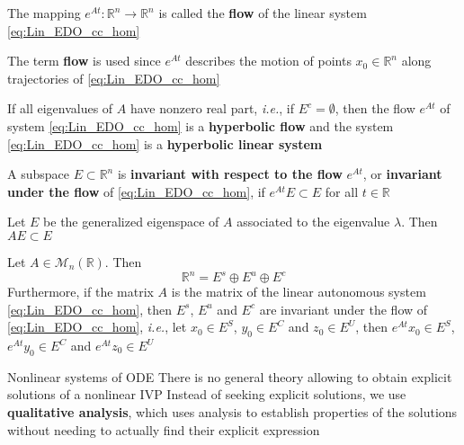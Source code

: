 \documentclass{beamer}
\def\ie{\emph{i.e.}}
\def\defword#1{\textbf{#1}}
\begin{document}
\begin{frame}
\begin{definition}
The mapping $e^{At}:\mathbb{R}^n\to\mathbb{R}^n$ is called the \defword{flow} of the linear system \eqref{eq:Lin_EDO_cc_hom}
\end{definition}
The term \defword{flow} is used since $e^{At}$ describes the motion of points $x_0\in\mathbb{R}^n$ along trajectories of \eqref{eq:Lin_EDO_cc_hom}
\begin{definition}
If all eigenvalues of $A$ have nonzero real part, \ie, if $E^c=\emptyset$, then the flow $e^{At}$ of system \eqref{eq:Lin_EDO_cc_hom} is a \defword{hyperbolic flow} and the system \eqref{eq:Lin_EDO_cc_hom} is a \defword{hyperbolic linear system}
\end{definition}
\begin{definition}
A subspace $E\subset\mathbb{R}^n$ is \defword{invariant with respect to the flow} $e^{At}$, or \defword{invariant under the flow} of \eqref{eq:Lin_EDO_cc_hom}, if $e^{At}E\subset E$ for all $t\in\mathbb{R}$
\end{definition}
\end{frame}

\begin{frame}
\begin{theorem}
Let $E$ be the generalized eigenspace of $A$ associated to the eigenvalue $\lambda$. Then $AE\subset E$
\end{theorem}

\begin{theorem}
Let $A\in\mathcal{M}_n(\mathbb{R})$. Then
\[
\mathbb{R}^n=E^s\oplus E^u\oplus E^c
\]
Furthermore, if the matrix $A$ is the matrix of the linear autonomous system \eqref{eq:Lin_EDO_cc_hom}, then $E^s$, $E^u$ and $E^c$ are invariant under the flow of \eqref{eq:Lin_EDO_cc_hom}, \ie, let
$x_0\in E^S$, $y_0\in E^C$ and $z_0\in E^U$, then $e^{At}x_0\in E^S$,
$e^{At}y_0\in E^C$ and $e^{At}z_0\in E^U$
\end{theorem}
\end{frame}



\begin{frame}{Nonlinear systems of ODE}
There is no general theory allowing to obtain explicit solutions of a nonlinear IVP
\vfill
Instead of seeking explicit solutions, we use \defword{qualitative analysis}, which uses analysis to establish properties of the solutions without needing to actually find their explicit expression
\end{frame}
\end{document}
